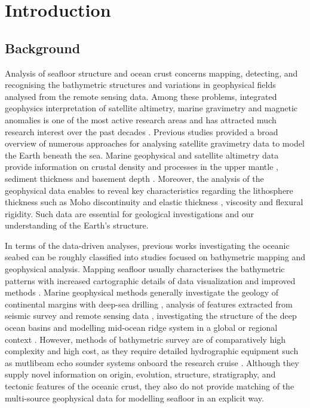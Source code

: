 \documentclass[geomatics,article,submit,pdftex,moreauthors]{Definitions/mdpi}
\begin{document}
\section{Introduction}

\subsection{Background}
Analysis of seafloor structure and ocean crust concerns mapping, detecting, and recognising the bathymetric structures and variations in geophysical fields analysed from the remote sensing data. Among these problems, integrated geophysics interpretation of satellite altimetry, marine gravimetry and magnetic anomalies is one of the most active research areas and has attracted much research interest over the past decades \cite{Bascou}. Previous studies \cite{ESHAGH2021313} provided a broad overview of numerous approaches for analysing satellite gravimetry data to model the Earth beneath the sea. Marine geophysical and satellite altimetry data provide information on crustal density and processes in the upper mantle \cite{KAPAWAR2021106692,PENG2022110823,ZHANG202368}, sediment thickness and basement depth \cite{Lemenkova202005}. Moreover, the analysis of the geophysical data enables to reveal key characteristics regarding the lithosphere thickness such as Moho discontinuity and elastic thickness \cite{TESAURO201378}, viscosity and flexural rigidity. Such data are essential for geological investigations and our understanding of the Earth's structure.

In terms of the data-driven analyses, previous works investigating the oceanic seabed can be roughly classified into studies focused on bathymetric mapping and geophysical analysis. Mapping seafloor usually characterises the bathymetric patterns with increased cartographic details of data visualization and improved methods \cite{Battista,Lemenkova202105,Lemenkova202012}. Marine geophysical methods generally investigate the geology of continental margins with deep-sea drilling \cite{Schlich1992TheGA,Veevers1991a}, analysis of features extracted from seismic survey and remote sensing data \cite{NEGI2022229330}, investigating the structure of the deep ocean basins \cite{BENARD2010633,RAMANA2001241,DAVIS201616} and modelling mid-ocean ridge system in a global or regional context \cite{FREY200073,Sreejith,Lemenkova202112}. However, methods of bathymetric survey are of comparatively high complexity and high cost, as they require detailed hydrographic equipment such as mutlibeam echo sounder systems onboard the research cruise \cite{Falvey}. Although they supply novel information on origin, evolution, structure, stratigraphy, and tectonic features of the oceanic crust, they also do not provide matching of the multi-source geophysical data for modelling seafloor in an explicit way. 
\end{document}
